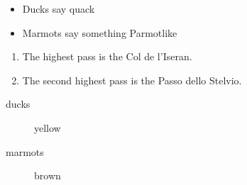 \documentclass{book}
\begin{document}
\begin{itemize}
\item Ducks say quack
\item Marmots say something Parmotlike
\end{itemize}

\begin{enumerate}
\item The highest pass is the Col de l'Iseran.
\item The second highest pass is the Passo dello Stelvio.
\end{enumerate}

\begin{description}
\item[ducks] yellow
\item[marmots] brown
\end{description}
\end{document}
